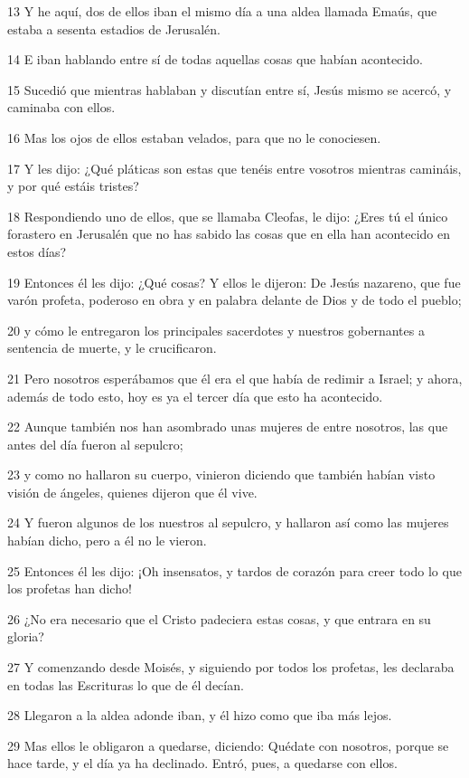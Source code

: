 \par 13 Y he aquí, dos de ellos iban el mismo día a una aldea llamada Emaús, que estaba a sesenta estadios de Jerusalén.
\par 14 E iban hablando entre sí de todas aquellas cosas que habían acontecido.
\par 15 Sucedió que mientras hablaban y discutían entre sí, Jesús mismo se acercó, y caminaba con ellos.
\par 16 Mas los ojos de ellos estaban velados, para que no le conociesen.
\par 17 Y les dijo: ¿Qué pláticas son estas que tenéis entre vosotros mientras camináis, y por qué estáis tristes?
\par 18 Respondiendo uno de ellos, que se llamaba Cleofas, le dijo: ¿Eres tú el único forastero en Jerusalén que no has sabido las cosas que en ella han acontecido en estos días?
\par 19 Entonces él les dijo: ¿Qué cosas? Y ellos le dijeron: De Jesús nazareno, que fue varón profeta, poderoso en obra y en palabra delante de Dios y de todo el pueblo;
\par 20 y cómo le entregaron los principales sacerdotes y nuestros gobernantes a sentencia de muerte, y le crucificaron.
\par 21 Pero nosotros esperábamos que él era el que había de redimir a Israel; y ahora, además de todo esto, hoy es ya el tercer día que esto ha acontecido.
\par 22 Aunque también nos han asombrado unas mujeres de entre nosotros, las que antes del día fueron al sepulcro;
\par 23 y como no hallaron su cuerpo, vinieron diciendo que también habían visto visión de ángeles, quienes dijeron que él vive.
\par 24 Y fueron algunos de los nuestros al sepulcro, y hallaron así como las mujeres habían dicho, pero a él no le vieron.
\par 25 Entonces él les dijo: ¡Oh insensatos, y tardos de corazón para creer todo lo que los profetas han dicho!
\par 26 ¿No era necesario que el Cristo padeciera estas cosas, y que entrara en su gloria?
\par 27 Y comenzando desde Moisés, y siguiendo por todos los profetas, les declaraba en todas las Escrituras lo que de él decían.
\par 28 Llegaron a la aldea adonde iban, y él hizo como que iba más lejos.
\par 29 Mas ellos le obligaron a quedarse, diciendo: Quédate con nosotros, porque se hace tarde, y el día ya ha declinado. Entró, pues, a quedarse con ellos.

